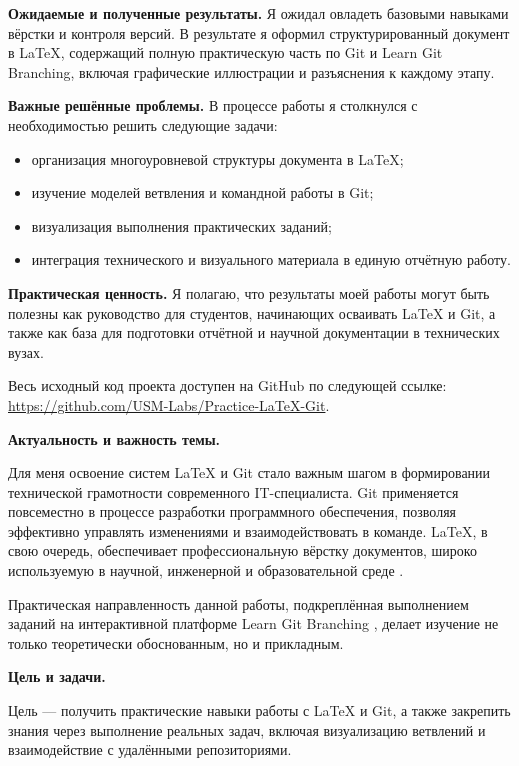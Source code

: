 \documentclass[a4paper,12pt]{report}
\newcommand{\github}{\url{https://github.com/USM-Labs/Practice-LaTeX-Git}}
\begin{document}
\textbf{Ожидаемые и полученные результаты.}
Я ожидал овладеть базовыми навыками вёрстки и контроля версий. В результате я оформил структурированный документ в \LaTeX{}, содержащий полную практическую часть по Git и Learn Git Branching, включая графические иллюстрации и разъяснения к каждому этапу.

\textbf{Важные решённые проблемы.}
В процессе работы я столкнулся с необходимостью решить следующие задачи:
\begin{itemize}
  \item организация многоуровневой структуры документа в \LaTeX{};
  \item изучение моделей ветвления и командной работы в Git;
  \item визуализация выполнения практических заданий;
  \item интеграция технического и визуального материала в единую отчётную работу.
\end{itemize}

\textbf{Практическая ценность.}
Я полагаю, что результаты моей работы могут быть полезны как руководство для студентов, начинающих осваивать \LaTeX{} и Git, а также как база для подготовки отчётной и научной документации в технических вузах.

Весь исходный код проекта доступен на GitHub по следующей ссылке: \github.


\introChapter

\textbf{Актуальность и важность темы.}

Для меня освоение систем \LaTeX{} и Git \cite{latex_official_doc, progit_book} стало важным шагом в формировании технической грамотности современного IT-специалиста. Git применяется повсеместно в процессе разработки программного обеспечения, позволяя эффективно управлять изменениями и взаимодействовать в команде. \LaTeX{}, в свою очередь, обеспечивает профессиональную вёрстку документов, широко используемую в научной, инженерной и образовательной среде \cite{latex_project_site, overleaf_intro}.

Практическая направленность данной работы, подкреплённая выполнением заданий на интерактивной платформе Learn Git Branching \cite{learngitbranching}, делает изучение не только теоретически обоснованным, но и прикладным.

\textbf{Цель и задачи.}

Цель — получить практические навыки работы с \LaTeX{} и Git, а также закрепить знания через выполнение реальных задач, включая визуализацию ветвлений и взаимодействие с удалёнными репозиториями.
\end{document}
